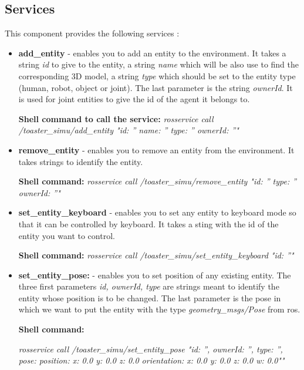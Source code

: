 \documentclass[a4paper]{article}
\begin{document}
\subsection{Services}
This component provides the following services :

\begin{itemize}
\item \textbf{add\_entity} - enables you to add an entity to the environment. It takes a string \textit{id} to give to the entity, a string \textit{name} which will be also use to find the corresponding 3D model, a string \textit{type} which should be set to the entity type (human, robot, object or joint). The last parameter is the string \textit{ownerId}. It is used for joint entities to give the id of the agent it belongs to.

\textbf{Shell command to call the service:}
\textit{rosservice call /toaster\_simu/add\_entity "id: ''
name: ''
type: ''
ownerId: ''"}


\item \textbf{remove\_entity} - enables you to remove an entity from the environment. It takes strings to identify the entity.

\textbf{Shell command:}
\textit{rosservice call /toaster\_simu/remove\_entity "id: ''
type: ''
ownerId: ''"}

\item \textbf{set\_entity\_keyboard} - enables you to set any entity to keyboard mode so that it can be controlled by keyboard. It takes a sting with the id of the entity you want to control.

\textbf{Shell command:}
\textit{rosservice call /toaster\_simu/set\_entity\_keyboard "id: ''"}

\item \textbf{set\_entity\_pose:} - enables you to set position of any existing entity. The three first parameters \textit{id, ownerId, type} are strings meant to identify the entity whose position is to be changed. The last parameter is the pose in which we want to put the entity with the type \textit{geometry\_msgs/Pose} from ros.

\textbf{Shell command:}

\textit{ rosservice call /toaster\_simu/set\_entity\_pose "{id: '', 
 ownerId: '', 
 type: '', 
 pose:
  position:
    x: 0.0
    y: 0.0
    z: 0.0
  orientation:
    x: 0.0
    y: 0.0
    z: 0.0
    w: 0.0"}" }
 
 
\end{itemize}
\end{document}

